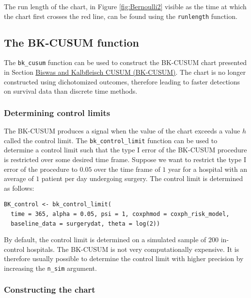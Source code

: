 The run length of the chart, in Figure \ref{fig:Bernoulli2} visible as the time at which the chart first crosses the red line, can be found using the \texttt{runlength} function.

\hypertarget{sec:BKCUSUMfunction}{%
\subsection{The BK-CUSUM function}\label{sec:BKCUSUMfunction}}

The \texttt{bk\_cusum} function can be used to construct the BK-CUSUM chart presented in Section \protect\hyperlink{sec:BKKCUSUM}{Biswas and Kalbfleisch CUSUM (BK-CUSUM)}. The chart is no longer constructed using dichotomized outcomes, therefore leading to faster detections on survival data than discrete time methods.

\hypertarget{determining-control-limits-1}{%
\subsubsection{Determining control limits}\label{determining-control-limits-1}}

The BK-CUSUM produces a signal when the value of the chart exceeds a value \(h\) called the control limit. The \texttt{bk\_control\_limit} function can be used to determine a control limit such that the type I error of the BK-CUSUM procedure is restricted over some desired time frame. Suppose we want to restrict the type I error of the procedure to \(0.05\) over the time frame of \(1\) year for a hospital with an average of \(1\) patient per day undergoing surgery. The control limit is determined as follows:

\begin{verbatim}
BK_control <- bk_control_limit(
  time = 365, alpha = 0.05, psi = 1, coxphmod = coxph_risk_model,
  baseline_data = surgerydat, theta = log(2))
\end{verbatim}

By default, the control limit is determined on a simulated sample of \(200\) in-control hospitals. The BK-CUSUM is not very computationally expensive. It is therefore usually possible to determine the control limit with higher precision by increasing the \texttt{n\_sim} argument.

\hypertarget{constructing-the-chart}{%
\subsubsection{Constructing the chart}\label{constructing-the-chart}}

